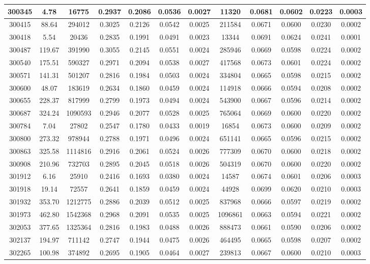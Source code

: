 \documentclass[10pt]{extarticle}
\begin{document}
\begin{longtable}{|c|c|c|c|c|c|c|c|c|c|c|c|}
\hline 
300345&4.78&16775&0.2937&0.2086&0.0536&0.0027&11320&0.0681&0.0602&0.0223&0.0003 \\ 
\hline 
300415&88.64&294012&0.3025&0.2126&0.0542&0.0025&211584&0.0671&0.0600&0.0230&0.0002 \\ 
\hline 
300418&5.54&20436&0.2835&0.1991&0.0491&0.0023&13344&0.0691&0.0624&0.0241&0.0001 \\ 
\hline 
300487&119.67&391990&0.3055&0.2145&0.0551&0.0024&285946&0.0669&0.0598&0.0224&0.0002 \\ 
\hline 
300540&175.51&590327&0.2971&0.2094&0.0538&0.0027&417568&0.0673&0.0601&0.0224&0.0002 \\ 
\hline 
300571&141.31&501207&0.2816&0.1984&0.0503&0.0024&334804&0.0665&0.0598&0.0215&0.0002 \\ 
\hline 
300600&48.07&183619&0.2634&0.1860&0.0459&0.0024&114918&0.0666&0.0594&0.0208&0.0002 \\ 
\hline 
300655&228.37&817999&0.2799&0.1973&0.0494&0.0024&543900&0.0667&0.0596&0.0214&0.0002 \\ 
\hline 
300687&324.24&1090593&0.2946&0.2077&0.0528&0.0025&765064&0.0669&0.0600&0.0220&0.0002 \\ 
\hline 
300784&7.04&27802&0.2547&0.1780&0.0433&0.0019&16854&0.0673&0.0600&0.0209&0.0002 \\ 
\hline 
300800&273.32&978944&0.2788&0.1971&0.0496&0.0024&651141&0.0665&0.0596&0.0215&0.0002 \\ 
\hline 
300863&325.58&1114816&0.2916&0.2061&0.0524&0.0026&777309&0.0670&0.0600&0.0218&0.0002 \\ 
\hline 
300908&210.96&732703&0.2895&0.2045&0.0518&0.0026&504319&0.0670&0.0600&0.0220&0.0002 \\ 
\hline 
301912&6.16&25910&0.2416&0.1693&0.0380&0.0024&14587&0.0674&0.0601&0.0206&0.0003 \\ 
\hline 
301918&19.14&72557&0.2641&0.1859&0.0459&0.0024&44928&0.0699&0.0620&0.0210&0.0003 \\ 
\hline 
301932&353.70&1212775&0.2886&0.2039&0.0512&0.0025&837968&0.0666&0.0597&0.0219&0.0002 \\ 
\hline 
301973&462.80&1542368&0.2968&0.2091&0.0535&0.0025&1096861&0.0663&0.0594&0.0221&0.0002 \\ 
\hline 
302053&377.65&1325364&0.2816&0.1983&0.0488&0.0026&888473&0.0661&0.0590&0.0206&0.0002 \\ 
\hline 
302137&194.97&711142&0.2747&0.1944&0.0475&0.0026&464495&0.0665&0.0598&0.0207&0.0002 \\ 
\hline 
302265&100.98&374892&0.2695&0.1905&0.0464&0.0027&239813&0.0667&0.0600&0.0210&0.0003 \\ 

\end{longtable}
\end{document}
